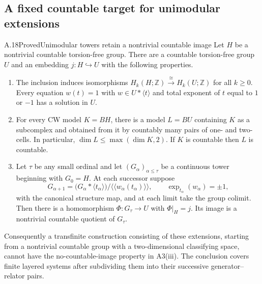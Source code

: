 \subsection{A fixed countable target for unimodular extensions}

\begin{claim}{A.18}{Proved}{Unimodular towers retain a nontrivial countable image}
Let $H$ be a nontrivial countable torsion-free group. There are a
countable torsion-free group $U$ and an embedding $j:H\hookrightarrow U$
with the following properties.
\begin{enumerate}
\item The inclusion induces isomorphisms
$H_k(H;\mathbb Z)\xrightarrow{\cong}H_k(U;\mathbb Z)$ for all $k\geq0$.
Every equation $w(t)=1$ with $w\in U*\langle t\rangle$ and total
exponent of $t$ equal to $1$ or $-1$ has a solution in $U$.
\item For every CW model $K=BH$, there is a model $L=BU$ containing
$K$ as a subcomplex and obtained from it by countably many pairs of
one- and two-cells. In particular,
$\dim L\leq\max(\dim K,2)$. If $K$ is countable then $L$ is countable.
\item Let $\tau$ be any small ordinal and let $(G_\alpha)_{\alpha\leq\tau}$
be a continuous tower beginning with $G_0=H$. At each successor suppose
\[
 G_{\alpha+1}
   =\bigl(G_\alpha*\langle t_\alpha\rangle\bigr)/
      \langle\!\langle w_\alpha(t_\alpha)\rangle\!\rangle,
 \qquad
 \operatorname{exp}_{t_\alpha}(w_\alpha)=\pm1,
 \tag{A.18.1}
\]
with the canonical structure map, and at each limit take the group
colimit. Then there is a homomorphism
$\Phi:G_\tau\to U$ with $\Phi|_H=j$. Its image is a nontrivial
countable quotient of $G_\tau$.
\end{enumerate}
Consequently a transfinite construction consisting of these extensions,
starting from a nontrivial countable group with a two-dimensional
classifying space, cannot have the no-countable-image property in
A3(iii). The conclusion covers finite layered systems after subdividing
them into their successive generator--relator pairs.
\end{claim}

